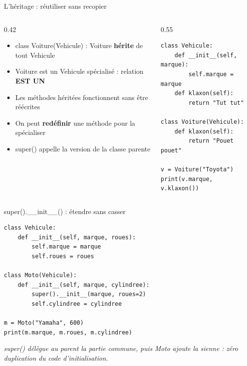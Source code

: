 \documentclass[aspectratio=169,11pt]{beamer}
\begin{document}
\begin{frame}[fragile]{L'héritage : réutiliser sans recopier}
\begin{columns}[t]
\begin{column}{0.42\textwidth}
\begin{itemize}
  \setlength{\itemsep}{1.5pt}\setlength{\parskip}{0pt}
  \item class Voiture(Vehicule) : Voiture \textbf{hérite} de tout Vehicule
  \item Voiture est un Vehicule spécialisé : relation \textbf{EST UN}
  \item Les méthodes héritées fonctionnent sans être réécrites
  \item On peut \textbf{redéfinir} une méthode pour la spécialiser
  \item super() appelle la version de la classe parente
\end{itemize}
\end{column}
\hspace{0.02\textwidth}
\begin{column}{0.55\textwidth}
\begin{lstlisting}[style=pysmall]
class Vehicule:
    def __init__(self, marque):
        self.marque = marque
    def klaxon(self):
        return "Tut tut"

class Voiture(Vehicule):
    def klaxon(self):
        return "Pouet pouet"

v = Voiture("Toyota")
print(v.marque, v.klaxon())
\end{lstlisting}
\end{column}
\end{columns}
\end{frame}

\begin{frame}[fragile]{super().\_\_init\_\_() : étendre sans casser}

\begin{lstlisting}[style=py]
class Vehicule:
    def __init__(self, marque, roues):
        self.marque = marque
        self.roues = roues

class Moto(Vehicule):
    def __init__(self, marque, cylindree):
        super().__init__(marque, roues=2)
        self.cylindree = cylindree

m = Moto("Yamaha", 600)
print(m.marque, m.roues, m.cylindree)
\end{lstlisting}
\vspace{0.5pt}

{\small\color{PyGris}\itshape super() délègue au parent la partie commune, puis Moto ajoute la sienne : zéro duplication du code d'initialisation.}

\end{frame}
\end{document}
